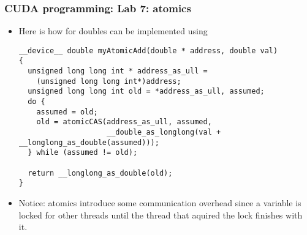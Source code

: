\begin{frame}[fragile]
  \frametitle{CUDA programming: Lab 7: atomics}
\begin{itemize}
\item Here is how  for doubles can be implemented using 
{\tiny
{\color{mycolorcode}
\begin{verbatim}
__device__ double myAtomicAdd(double * address, double val)
{
  unsigned long long int * address_as_ull = 
    (unsigned long long int*)address;
  unsigned long long int old = *address_as_ull, assumed;
  do {
    assumed = old;
    old = atomicCAS(address_as_ull, assumed,
                    __double_as_longlong(val + __longlong_as_double(assumed)));
  } while (assumed != old);

  return __longlong_as_double(old);
}
\end{verbatim}
}
}
\item Notice: atomics introduce some communication overhead since a variable is locked for other threads until the thread 
  that aquired the lock finishes with it.
\end{itemize}
\end{frame}
